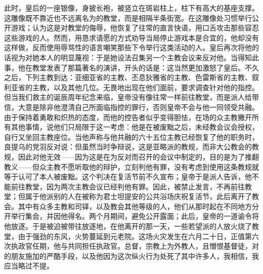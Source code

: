 此时，皇后的一座银像，身披长袍，被竖立在斑岩柱上，柱下有高大的基座支撑。这雕像既不靠近也不远离名为的教堂，而是相隔半条街宽。在这雕像处习惯举行公开游戏；认为这是对教堂的侮辱，他恢复了往常的直言快语，用口舌攻击那些容忍这些游戏的人。然而，用恳求请愿的方式劝导当局停止游戏本是合宜的，他却没有这样做，反而使用辱骂性的语言嘲笑那些下令举行这类活动的人。皇后再次将他的话视为对她本人的明显蔑视：于是她设法召集另一个主教会议来反对他。当得知此事，他在教堂发表了那篇著名的演讲，开头的话是：这当然更加激怒了皇后。不久之后，下列主教到达：亚细亚省的主教、丕息狄雅省的主教、色雷斯省的主教、叙利亚省的主教，以及其他几位。无畏地出现在他们面前，要求调查针对他的指控。但当我们救主的诞辰周年纪念来临，皇帝没有像往常一样前往教堂，而是派人给带信，大意是除非他澄清自己所面临指控的罪行，否则皇帝不会与他一同领受共融。由于保持着勇敢和炽热的态度，而他的控告者似乎变得胆怯，在场的众主教撇开所有其他事情，说他们只局限于这一考虑：他是在被废黜之后，未经教会议会授权，自行又坐回主教座位。当他声称与他共融的六十五位主教已经恢复了他的职务时，良提乌的党羽反对说：但虽然当时争辩说，这是亚略派的教规，而非大公教会的教规，因此对他无效——因为这是在为反对而召开的会议中制定的，目的是为了推翻教义——但众主教不愿听取他的辩护，立刻判他有罪，没有考虑到使用这条教规就等于认可了本人被废黜。这个判决在复活节前不久宣布；皇帝于是派人告诉，他不能前往教堂，因为两次主教会议已经判他有罪。因此，被禁止发言，不再前往教堂；但属于他派别的人在被称为君士坦提安的公共浴场庆祝复活节，此后离开了教会。其中有众多主教和司铎，以及教会其他等级的人，他们从那时起在不同地方分开举行集会，并因他得名。两个月期间，避免公开露面；此后，皇帝的一道谕令将他放逐。于是被迫被带往放逐地，在他离开的那一天，一些若望派的人放火烧了教堂，由于强劲的东风，火势蔓延到元老院。这场火灾发生在六月二十日，正值第六次执政官任期，他与共同担任执政官。总督，宗教上为外教人，且憎恨基督徒，对的朋友施加的严酷手段，以及他因为这次纵火行为处死了其中许多人，我相信，我应当略过不提。\par

